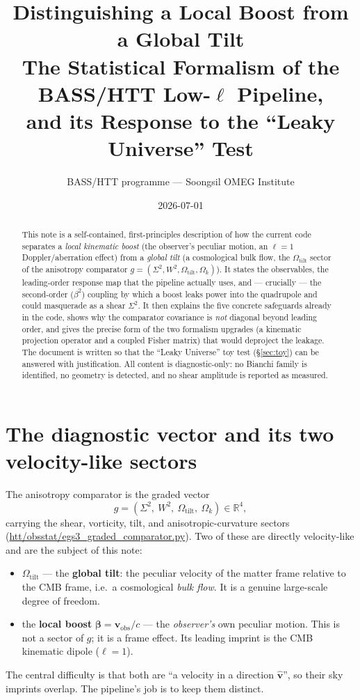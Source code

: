 \documentclass[11pt]{article}
\title{\textbf{Distinguishing a Local Boost from a Global Tilt}\\[2pt]
\large The Statistical Formalism of the BASS/HTT Low-$\ell$ Pipeline,\\
and its Response to the ``Leaky Universe'' Test}
\author{BASS/HTT programme --- Soongsil OMEG Institute}
\date{2026-07-01}
\newcommand{\pathx}[1]{{\small\urlstyle{tt}\url{#1}}}  %
\newcommand{\Sig}{\Sigma^2}
\newcommand{\Wsq}{W^2}
\newcommand{\Otilt}{\Omega_{\mathrm{tilt}}}
\newcommand{\Ok}{\Omega_{k}}
\newcommand{\vhat}{\hat{\mathbf v}}
\begin{document}
\maketitle

\begin{abstract}
\noindent This note is a self-contained, first-principles description of how the
current code separates a \emph{local kinematic boost} (the observer's peculiar
motion, an $\ell=1$ Doppler/aberration effect) from a \emph{global tilt} (a
cosmological bulk flow, the $\Otilt$ sector of the anisotropy comparator
$g=(\Sig,\Wsq,\Otilt,\Ok)$). It states the observables, the leading-order
response map that the pipeline actually uses, and --- crucially --- the
second-order ($\beta^2$) coupling by which a boost leaks power into the
quadrupole and could masquerade as a shear $\Sig$. It then explains the five
concrete safeguards already in the code, shows why the comparator covariance is
\emph{not} diagonal beyond leading order, and gives the precise form of the two
formalism upgrades (a kinematic projection operator and a coupled Fisher matrix)
that would deproject the leakage. The document is written so that the ``Leaky
Universe'' toy test (\S\ref{sec:toy}) can be answered with justification. All
content is diagnostic-only: no Bianchi family is identified, no geometry is
detected, and no shear amplitude is reported as measured.
\end{abstract}

\section{The diagnostic vector and its two velocity-like sectors}
\label{sec:vector}

The anisotropy comparator is the graded vector
\begin{equation}
  g=(\Sig,\ \Wsq,\ \Otilt,\ \Ok)\in\mathbb{R}^4 ,
\end{equation}
carrying the shear, vorticity, tilt, and anisotropic-curvature sectors
(\pathx{htt/obsstat/egs3_graded_comparator.py}). Two of these are directly
velocity-like and are the subject of this note:
\begin{itemize}
\item $\Otilt$ --- the \textbf{global tilt}: the peculiar velocity of the matter
frame relative to the CMB frame, i.e.\ a cosmological \emph{bulk flow}. It is a
genuine large-scale degree of freedom.
\item the \textbf{local boost} $\boldsymbol\beta=\mathbf v_{\mathrm{obs}}/c$ ---
the \emph{observer's} own peculiar motion. This is not a sector of $g$; it is a
frame effect. Its leading imprint is the CMB kinematic dipole ($\ell=1$).
\end{itemize}
The central difficulty is that both are ``a velocity in a direction $\vhat$'', so
their sky imprints overlap. The pipeline's job is to keep them distinct.
\end{document}
